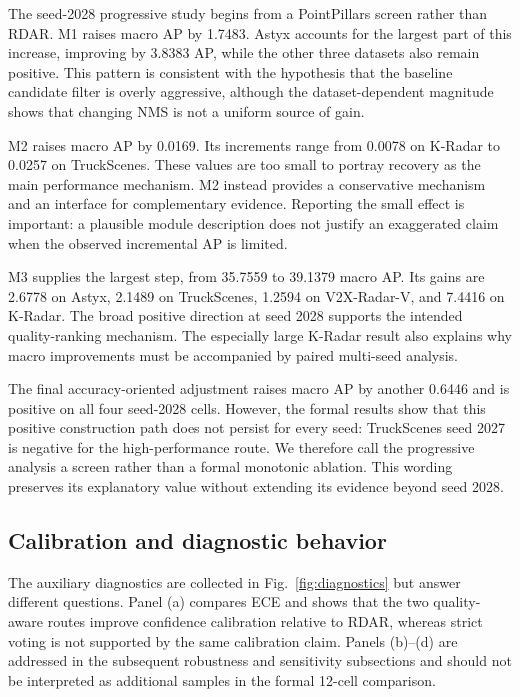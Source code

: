 \documentclass[final,5p,times]{elsarticle}
\newcommand{\figref}[1]{\textcolor{floatreviewblue}{Fig.~\ref{#1}}}
\newcommand{\figref}[1]{Fig.~\ref{#1}}
\begin{document}
The seed-2028 progressive study begins from a PointPillars
screen rather than RDAR. M1 raises macro AP by 1.7483. Astyx accounts for the
largest part of this increase, improving by 3.8383 AP, while the other three
datasets also remain positive. This pattern is consistent with the hypothesis
that the baseline candidate filter is overly aggressive, although the
dataset-dependent magnitude shows that changing NMS is not a uniform source of
gain.

M2 raises macro AP by 0.0169. Its increments range from 0.0078 on K-Radar to
0.0257 on TruckScenes. These values are too small to portray recovery as the
main performance mechanism. M2 instead provides a conservative mechanism and
an interface for complementary evidence. Reporting the small effect is
important: a plausible module description does not justify an exaggerated
claim when the observed incremental AP is limited.

M3 supplies the largest step, from 35.7559 to 39.1379 macro AP. Its gains are
2.6778 on Astyx, 2.1489 on TruckScenes, 1.2594 on V2X-Radar-V, and 7.4416 on
K-Radar. The broad positive direction at seed 2028 supports the intended
quality-ranking mechanism. The especially large K-Radar result also explains
why macro improvements must be accompanied by paired multi-seed analysis.

The final accuracy-oriented adjustment raises macro AP by another 0.6446 and
is positive on all four seed-2028 cells. However, the formal results show that
this positive construction path does not persist for every seed: TruckScenes
seed 2027 is negative for the high-performance route. We therefore call
the progressive analysis a screen rather than a formal monotonic
ablation. This wording preserves its explanatory value without extending its
evidence beyond seed 2028.

\subsection{Calibration and diagnostic behavior}
\label{sec:calibration}

The auxiliary diagnostics are collected in \figref{fig:diagnostics} but answer
different questions. Panel (a) compares ECE and shows that the two
quality-aware routes improve confidence calibration relative to RDAR, whereas
strict voting is not supported by the same calibration claim. Panels (b)--(d)
are addressed in the subsequent robustness and sensitivity subsections and
should not be interpreted as additional samples in the formal 12-cell
comparison.
\end{document}
